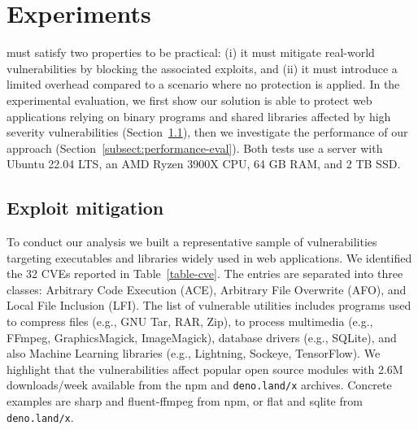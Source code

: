 \section{Experiments}
\label{natisand:sect:exp}

\pap must satisfy two properties to be practical: (i) it must mitigate
real-world vulnerabilities by blocking the associated exploits, and
(ii) it must introduce a limited overhead compared to a scenario where
no protection is applied. In the experimental evaluation, we first
show our solution is able to protect web applications relying on
binary programs and shared libraries affected by high severity
vulnerabilities (Section~\ref{subnatisand:sect:exploit-mitigation}), then we
investigate the performance of our approach
(Section~\ref{subsect:performance-eval}).
Both tests use a server with Ubuntu 22.04 LTS, an AMD Ryzen 3900X CPU,
64 GB RAM, and 2 TB SSD.

\subsection{Exploit mitigation}
\label{subnatisand:sect:exploit-mitigation}

To conduct our analysis we built a representative sample of
vulnerabilities targeting executables and libraries widely used in web
applications. We identified the 32 CVEs reported in
Table~\ref{table-cve}. The entries are separated into three classes:
Arbitrary Code Execution (ACE), Arbitrary File Overwrite (AFO), and
Local File Inclusion (LFI). The list of vulnerable utilities includes
programs used to compress files (e.g., GNU Tar, RAR, Zip), to process
multimedia (e.g., FFmpeg, GraphicsMagick, ImageMagick), database
drivers (e.g., SQLite), and also Machine Learning libraries (e.g.,
Lightning, Sockeye, TensorFlow). We highlight that the vulnerabilities
affect popular open source modules with 2.6M downloads/week available
from the npm and {\tt deno.land/x} archives. Concrete examples are
sharp and fluent-ffmpeg from npm, or flat and sqlite from {\tt
  deno.land/x}.


